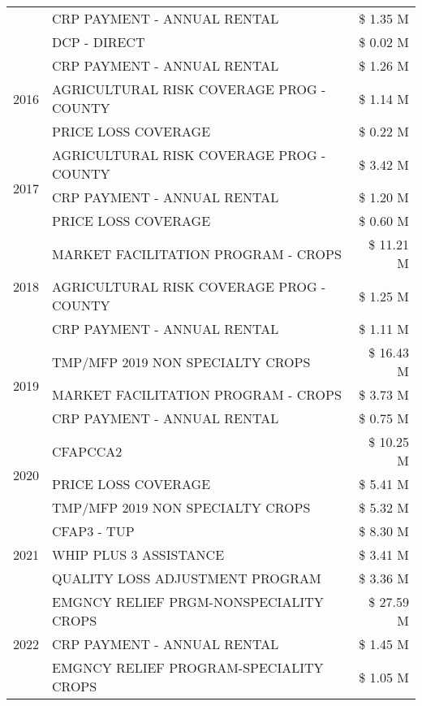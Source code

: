 \begin{tabular}{llr}
 & CRP PAYMENT - ANNUAL RENTAL & \$ 1.35 M \\
 & DCP - DIRECT & \$ 0.02 M \\
\cline{1-3}
\multirow[t]{3}{*}{2016} & CRP PAYMENT - ANNUAL RENTAL & \$ 1.26 M \\
 & AGRICULTURAL RISK COVERAGE PROG - COUNTY & \$ 1.14 M \\
 & PRICE LOSS COVERAGE & \$ 0.22 M \\
\cline{1-3}
\multirow[t]{3}{*}{2017} & AGRICULTURAL RISK COVERAGE PROG - COUNTY & \$ 3.42 M \\
 & CRP PAYMENT - ANNUAL RENTAL & \$ 1.20 M \\
 & PRICE LOSS COVERAGE & \$ 0.60 M \\
\cline{1-3}
\multirow[t]{3}{*}{2018} & MARKET FACILITATION PROGRAM - CROPS & \$ 11.21 M \\
 & AGRICULTURAL RISK COVERAGE PROG - COUNTY & \$ 1.25 M \\
 & CRP PAYMENT - ANNUAL RENTAL & \$ 1.11 M \\
\cline{1-3}
\multirow[t]{3}{*}{2019} & TMP/MFP 2019 NON SPECIALTY CROPS & \$ 16.43 M \\
 & MARKET FACILITATION PROGRAM - CROPS & \$ 3.73 M \\
 & CRP PAYMENT - ANNUAL RENTAL & \$ 0.75 M \\
\cline{1-3}
\multirow[t]{3}{*}{2020} & CFAPCCA2 & \$ 10.25 M \\
 & PRICE LOSS COVERAGE & \$ 5.41 M \\
 & TMP/MFP 2019 NON SPECIALTY CROPS & \$ 5.32 M \\
\cline{1-3}
\multirow[t]{3}{*}{2021} & CFAP3 - TUP & \$ 8.30 M \\
 & WHIP PLUS 3 ASSISTANCE & \$ 3.41 M \\
 & QUALITY LOSS ADJUSTMENT PROGRAM & \$ 3.36 M \\
\cline{1-3}
\multirow[t]{3}{*}{2022} & EMGNCY RELIEF PRGM-NONSPECIALITY CROPS & \$ 27.59 M \\
 & CRP PAYMENT - ANNUAL RENTAL & \$ 1.45 M \\
 & EMGNCY RELIEF PROGRAM-SPECIALITY CROPS & \$ 1.05 M \\
\cline{1-3}
\bottomrule
\end{tabular}
